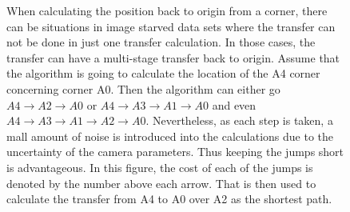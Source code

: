 \begin{figure}
    \centering
    \caption[Transfer location]{
    When calculating the position back to origin from a corner, there can be situations in image starved data sets where the transfer can not be done in just one transfer calculation.
    In those cases, the transfer can have a multi-stage transfer back to origin.
    Assume that the algorithm is going to calculate the location of the A4 corner concerning corner A0. Then the algorithm can either go $A4\rightarrow A2 \rightarrow A0$ or $A4\rightarrow A3\rightarrow A1\rightarrow A0$ and even $A4\rightarrow A3\rightarrow A1\rightarrow A2 \rightarrow A0$. Nevertheless, as each step is taken, a mall amount of noise is introduced into the calculations due to the uncertainty of the camera parameters.
    Thus keeping the jumps short is advantageous.
    In this figure, the cost of each of the jumps is denoted by the number above each arrow.
    That is then used to calculate the transfer from A4 to A0 over A2 as the shortest path.
    }
    \label{fig:multipath}
\end{figure}





